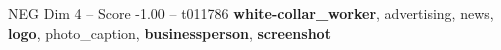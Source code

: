 \begin{textsample}{NEG Dim 4 – Score -1.00 – t011786}  \label{ex:f4_neg_025}
\textbf{white-collar\_worker}, advertising, news, \textbf{logo}, photo\_caption, \textbf{businessperson}, \textbf{screenshot}

\end{textsample}
